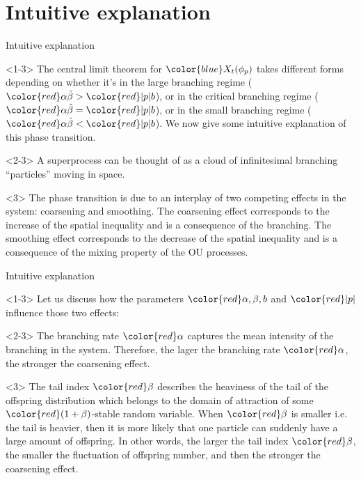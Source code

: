 \documentclass[xcolor=dvipsnames]{beamer}
\begin{document}
\section{Intuitive explanation}

\begin{frame}{Intuitive explanation}
\begin{block}{}<1-3>
	The central limit theorem for $\color{blue}X_t(\phi_p)$ takes different forms depending on whether it's in the large branching regime (${\color{red}\alpha \tilde \beta > {\color{red}|p|}  b}$), or in the critical branching regime (${\color{red}\alpha \tilde \beta = {\color{red}|p|}  b}$), or in the small branching regime (${\color{red}\alpha \tilde \beta < {\color{red}|p|}  b}$).
	We now give some intuitive explanation of this phase transition.
\end{block}

\begin{block}{}<2-3>
	A superprocess can be thought of as a cloud of infinitesimal branching ``particles'' moving in space.
\end{block}

\begin{block}{}<3>
	The phase transition is due to an interplay of two competing effects in the system: coarsening and smoothing.
	The coarsening effect corresponds to the increase of the spatial inequality and is a consequence of the branching.
	The smoothing effect corresponds to the decrease of the spatial inequality and is a consequence of the mixing property of the OU processes.
\end{block}

\end{frame}

\begin{frame}{Intuitive explanation}
\begin{block}{}<1-3>
	Let us discuss how the parameters $\color{red}\alpha, \beta, b$ and ${\color{red}|p|}$
	influence those two effects:
\end{block}
\begin{block}{}<2-3>
		The branching rate $\color{red}\alpha$ captures the mean intensity of the branching in the system.
		Therefore, the lager the branching rate $\color{red}\alpha$, the stronger the coarsening effect.
\end{block}
\begin{block}{}<3>
		The tail index $\color{red}\beta$ describes the heaviness of the tail of the offspring distribution which belongs to the domain of attraction of some $\color{red}(1+\beta)$-stable random variable.
		When $\color{red}\beta$ is smaller i.e. the tail is heavier, then it is more likely that 
		one particle can suddenly have a large amount of offspring.
		In other words, the larger the tail index $\color{red}\beta$, the smaller the fluctuation of offspring number, and then the stronger the coarsening effect.
\end{block}
\end{frame}
\end{document}
